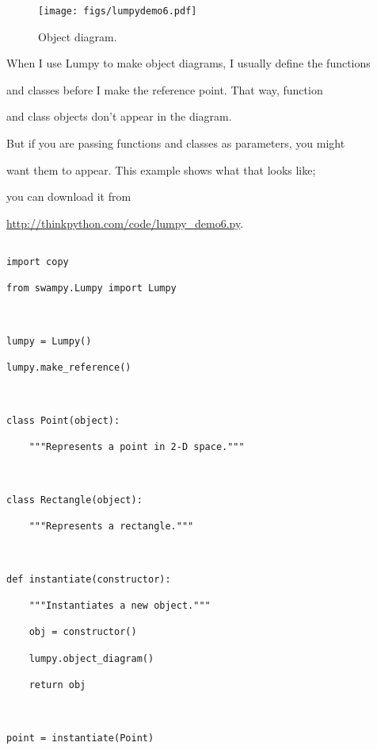 \begin{figure}

\centerline

{\texttt{[image: figs/lumpydemo6.pdf]}}

\caption{Object diagram.}

\label{fig.lumpy6}

\end{figure}



When I use Lumpy to make object diagrams, I usually define the functions

and classes before I make the reference point.  That way, function

and class objects don't appear in the diagram.







But if you are passing functions and classes as parameters, you might

want them to appear.  This example shows what that looks like;

you can download it from

\url{http://thinkpython.com/code/lumpy_demo6.py}.



\begin{verbatim}

import copy

from swampy.Lumpy import Lumpy



lumpy = Lumpy()

lumpy.make_reference()



class Point(object):

    """Represents a point in 2-D space."""



class Rectangle(object):

    """Represents a rectangle."""



def instantiate(constructor):

    """Instantiates a new object."""

    obj = constructor()

    lumpy.object_diagram()

    return obj



point = instantiate(Point)

\end{verbatim}




